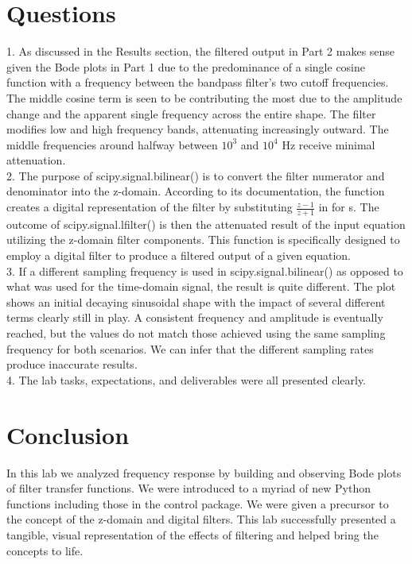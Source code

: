 \documentclass[12pt]{report}
\begin{document}
\section{Questions}

1. As discussed in the Results section, the filtered output in Part 2 makes sense given the Bode plots in Part 1 due to the predominance of a single cosine function with a frequency between the bandpass filter's two cutoff frequencies. The middle cosine term is seen to be contributing the most due to the amplitude change and the apparent single frequency across the entire shape. The filter modifies low and high frequency bands, attenuating increasingly outward. The middle frequencies around halfway between $ 10^3 $ and $ 10^4 $ Hz receive minimal attenuation. \\

2. The purpose of scipy.signal.bilinear() is to convert the filter numerator and denominator into the z-domain. According to its documentation, the function creates a digital representation of the filter by substituting $ \frac{z - 1}{z + 1} $ in for s. The outcome of scipy.signal.lfilter() is then the attenuated result of the input equation utilizing the z-domain filter components. This function is specifically designed to employ a digital filter to produce a filtered output of a given equation. \\

3. If a different sampling frequency is used in scipy.signal.bilinear() as opposed to what was used for the time-domain signal, the result is quite different. The plot shows an initial decaying sinusoidal shape with the impact of several different terms clearly still in play. A consistent frequency and amplitude is eventually reached, but the values do not match those achieved using the same sampling frequency for both scenarios. We can infer that the different sampling rates produce inaccurate results. \\

4. The lab tasks, expectations, and deliverables were all presented clearly. \\

\section{Conclusion}

In this lab we analyzed frequency response by building and observing Bode plots of filter transfer functions. We were introduced to a myriad of new Python functions including those in the control package. We were given a precursor to the concept of the z-domain and digital filters. This lab successfully presented a tangible, visual representation of the effects of filtering and helped bring the concepts to life. \\
\end{document}
